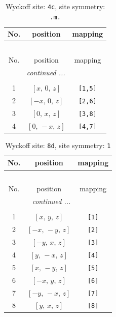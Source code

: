 \documentclass[fleqn,8pt]{jsarticle}
\begin{document}
\renewcommand{\arraystretch}{1.2}
\begin{longtable}{ccc}
\caption{Wyckoff site: {\tt 4c}, site symmetry: {\tt .m.}}
 \\
 \hline \hline
No. & position & mapping \\ \hline \endfirsthead

\multicolumn{2}{l}{\tablename\ \thetable{}} \\
 \hline \hline
No. & position & mapping \\ \hline \endhead

 \hline \hline
\multicolumn{2}{r}{\footnotesize\it continued ...} \\ \endfoot

 \hline \hline
\multicolumn{2}{r}{} \\ \endlastfoot

1 & $\left[ x,\, 0,\, z \right]$ & {\tt [1,5]} \\ \hline
2 & $\left[ - x,\, 0,\, z \right]$ & {\tt [2,6]} \\ \hline
3 & $\left[ 0,\, x,\, z \right]$ & {\tt [3,8]} \\ \hline
4 & $\left[ 0,\, - x,\, z \right]$ & {\tt [4,7]} \\
\end{longtable}
\renewcommand{\arraystretch}{1.2}
\begin{longtable}{ccc}
\caption{Wyckoff site: {\tt 8d}, site symmetry: {\tt 1}}
 \\
 \hline \hline
No. & position & mapping \\ \hline \endfirsthead

\multicolumn{2}{l}{\tablename\ \thetable{}} \\
 \hline \hline
No. & position & mapping \\ \hline \endhead

 \hline \hline
\multicolumn{2}{r}{\footnotesize\it continued ...} \\ \endfoot

 \hline \hline
\multicolumn{2}{r}{} \\ \endlastfoot

1 & $\left[ x,\, y,\, z \right]$ & {\tt [1]} \\ \hline
2 & $\left[ - x,\, - y,\, z \right]$ & {\tt [2]} \\ \hline
3 & $\left[ - y,\, x,\, z \right]$ & {\tt [3]} \\ \hline
4 & $\left[ y,\, - x,\, z \right]$ & {\tt [4]} \\ \hline
5 & $\left[ x,\, - y,\, z \right]$ & {\tt [5]} \\ \hline
6 & $\left[ - x,\, y,\, z \right]$ & {\tt [6]} \\ \hline
7 & $\left[ - y,\, - x,\, z \right]$ & {\tt [7]} \\ \hline
8 & $\left[ y,\, x,\, z \right]$ & {\tt [8]} \\
\end{longtable}
\end{document}
